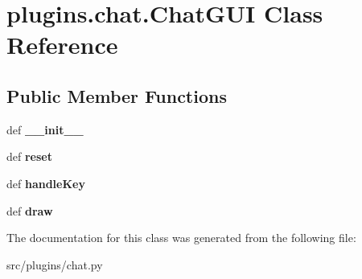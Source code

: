 \hypertarget{classplugins_1_1chat_1_1_chat_g_u_i}{\section{plugins.\-chat.\-Chat\-G\-U\-I \-Class \-Reference}
\label{classplugins_1_1chat_1_1_chat_g_u_i}
}
\subsection*{\-Public \-Member \-Functions}
\begin{DoxyCompactItemize}
\item 
\hypertarget{classplugins_1_1chat_1_1_chat_g_u_i_ac012abd636541b85d4f1a2d044222abd}{def {\bfseries \-\_\-\-\_\-init\-\_\-\-\_\-}}\label{classplugins_1_1chat_1_1_chat_g_u_i_ac012abd636541b85d4f1a2d044222abd}

\item 
\hypertarget{classplugins_1_1chat_1_1_chat_g_u_i_a3d581f6c32af1ff3f1ae49f07f7d6a31}{def {\bfseries reset}}\label{classplugins_1_1chat_1_1_chat_g_u_i_a3d581f6c32af1ff3f1ae49f07f7d6a31}

\item 
\hypertarget{classplugins_1_1chat_1_1_chat_g_u_i_a53dd0402f1014886ad7ada38dde96a02}{def {\bfseries handle\-Key}}\label{classplugins_1_1chat_1_1_chat_g_u_i_a53dd0402f1014886ad7ada38dde96a02}

\item 
\hypertarget{classplugins_1_1chat_1_1_chat_g_u_i_a00c5416542ab5c892ebf11a69ceb4216}{def {\bfseries draw}}\label{classplugins_1_1chat_1_1_chat_g_u_i_a00c5416542ab5c892ebf11a69ceb4216}

\end{DoxyCompactItemize}


\-The documentation for this class was generated from the following file\-:\begin{DoxyCompactItemize}
\item 
src/plugins/chat.\-py\end{DoxyCompactItemize}
